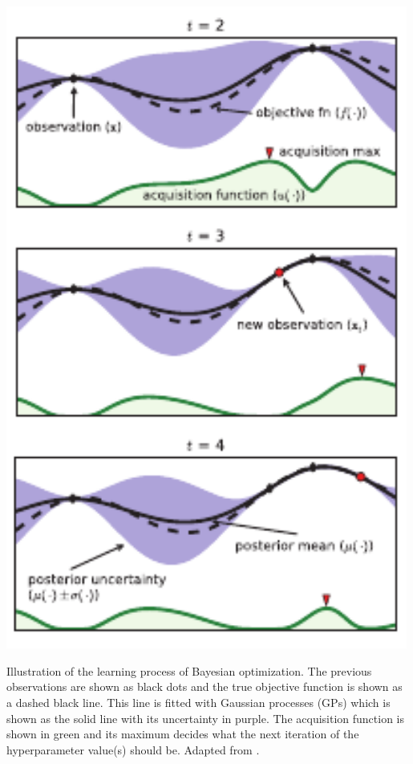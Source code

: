 \begin{marginfigure}[-2cm]
  \includegraphics[width=0.99\textwidth]{figures/bayesian_optimization/bo.pdf}
  \caption[Bayesian Optimization]{Illustration of the learning process of Bayesian optimization. The previous observations are shown as black dots and the true objective function is shown as a dashed black line. This line is fitted with Gaussian processes (GPs) which is shown as the solid line with its uncertainty in purple. The acquisition function is shown in green and its maximum decides what the next iteration of the hyperparameter value(s) should be. 
  Adapted from \citet{brochuTutorialBayesianOptimization2010}.}
  \label{fig:ml:bayesian_optimization}
\end{marginfigure}

